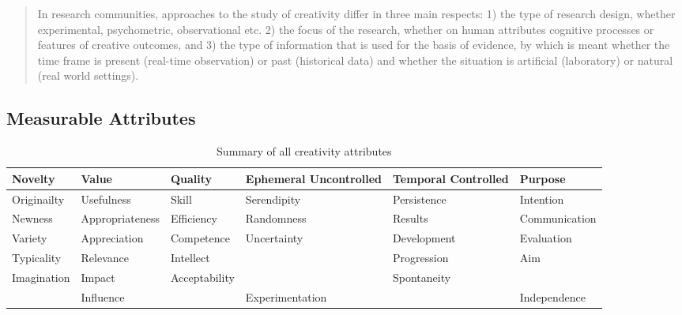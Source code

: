 \begin{quote}
  In research communities, approaches to the study of creativity differ in three main respects: 1) the type of research design, whether experimental, psychometric, observational etc. 2) the focus of the research, whether on human attributes cognitive processes or features of creative outcomes, and 3) the type of information that is used for the basis of evidence, by which is meant whether the time frame is present (real-time observation) or past (historical data) and whether the situation is artificial (laboratory) or natural (real world settings). \citep[p.3]{Candy2012}
\end{quote}

\begin{comment}
  distinguishing between person’s and product’s creativity \citep[p.258]{Piffer2012}
  it is concluded that a person’s creativity can only be assessed indirectly (for example with self report questionnaires or official external recognition) but it cannot be measured \citep[p.258]{Piffer2012}
\end{comment}


\subsection{Measurable Attributes}

\begin{table}[htb]
  \begin{tabu}{XXXXXX}
  \toprule
  \textbf{Novelty}
  &
  \textbf{Value}
  &
  \textbf{Quality}
  &
  \textbf{Ephemeral Uncontrolled}
  &
  \textbf{Temporal Controlled}
  &
  \textbf{Purpose}
  \\ \midrule
  Originailty
  &
  Usefulness
  &
  Skill
  &
  Serendipity
  &
  Persistence
  &
  Intention
  \\ \midrule
  Newness
  &
  Appropriateness
  &
  Efficiency
  &
  Randomness
  &
  Results
  &
  Communication
  \\ \midrule
  Variety
  &
  Appreciation
  &
  Competence
  &
  Uncertainty
  &
  Development
  &
  Evaluation
  \\ \midrule
  Typicality
  &
  Relevance
  &
  Intellect
  &
  &
  Progression
  &
  Aim
  \\ \midrule
  Imagination
  &
  Impact
  &
  Acceptability
  &
  &
  Spontaneity
  &
  \\ \midrule
  &
  Influence
  &
  &
  Experimentation
  &
  &
  Independence
  \\
  \bottomrule
  \end{tabu}
\caption[Creativity attributes]{Summary of all creativity attributes}
\label{creatt}
\end{table}

